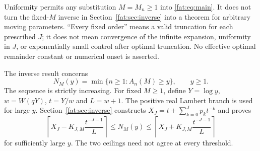 \documentclass[11pt,letterpaper]{article}
\numberwithin{equation}{section}
\theoremstyle{remark}\newtheorem{remark}[theorem]{Remark}
\begin{document}
Uniformity permits any substitution $M=M_n\ge1$ into \eqref{fat:eq:main}. It does not turn the fixed-$M$ inverse in Section~\ref{fat:sec:inverse} into a theorem for arbitrary moving parameters. ``Every fixed order'' means a valid truncation for each prescribed $J$; it does not mean convergence of the infinite expansion, uniformity in $J$, or exponentially small control after optimal truncation. No effective optimal remainder constant or numerical onset is asserted.

The inverse result concerns
\[
 N_M(y)=\min\{n\ge1:A_n(M)\ge y\},\qquad y\ge1.
\]
The sequence is strictly increasing. For fixed $M\ge1$, define $Y=\log y$, $w=W(qY)$, $t=Y/w$ and $L=w+1$. The positive real Lambert branch is used for large $y$. Section~\ref{fat:sec:inverse} constructs $X_J=t+\sum_{k=0}^Jp_kt^{-k}$ and proves
\begin{equation}\label{fat:eq:inverse-preview}
 \left\lceil X_J-K_{J,M}\frac{t^{-J-1}}L\right\rceil
 \le N_M(y)\le
 \left\lceil X_J+K_{J,M}\frac{t^{-J-1}}L\right\rceil
\end{equation}
for sufficiently large $y$. The two ceilings need not agree at every threshold.
\end{document}
